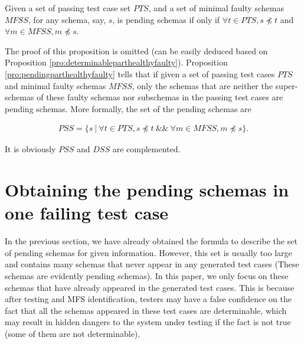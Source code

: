 
\begin{proposition}\label{pro:pendingparthealthyfaulty}
Given a set of passing test case set $PTS$, and a set of minimal faulty schemas $MFSS$, for any schema, say, $s$, is pending schemas if only if $\forall t \in PTS, s \npreceq t$ and $\forall m \in MFSS, m \npreceq s$.
\end{proposition}

The proof of this proposition is omitted (can be easily deduced based on Proposition \ref{pro:determinableparthealthyfaulty}). Proposition \ref{pro:pendingparthealthyfaulty} tells that if given a set of passing test cases $PTS$ and minimal faulty schemas $MFSS$, only the schemas that are neither the super-schemas of these faulty schemas nor subschemas in the passing test cases are pending schemas.  More formally, the set of the pending schemas are

\begin{equation}
\begin{aligned}\label{eq:pss}
PSS=\{ s\ |\ \forall t \in PTS,  s \npreceq t  \ \&\& \  \forall m \in MFSS, m \npreceq s \}.
\end{aligned}
\end{equation}

It is obviously $PSS$ and $DSS$ are complemented.

%
%

%

\section{Obtaining the pending schemas in one failing test case}\label{sec:pending:obtaining}

In the previous section, we have already obtained the formula to describe the set of pending schemas for given information. However, this set is usually too large and contains many schemas that never appear in any generated test cases (These schemas are evidently pending schemas). In this paper, we only focus on these schemas that have already appeared in the generated test cases. This is because after testing and MFS identification, testers may have a false confidence on the fact that all the schemas appeared in these test cases are determinable, which may result in hidden dangers to the system under testing if the fact is not true (some of them are not determinable).

